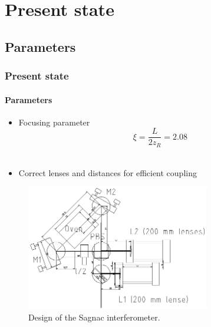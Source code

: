 \documentclass[serif,8pt]{beamer}
\begin{document}
\section{Present state}
\subsection{Parameters}
\begin{frame}[t]
	\frametitle{Present state}
	\framesubtitle{Parameters}
		\begin{itemize}
			\item Focusing parameter \cite{bennik}
					\begin{equation*}
							\xi = \frac{L}{2 z_R} = 2.08
						\label{eq:Focusing parameter}
					\end{equation*}\\
			\item Correct lenses and distances for efficient coupling
		\end{itemize}
	\begin{figure}[!ht]
	  \centering
	  \includegraphics[width=8cm]{SagnacDesign.png}
	  \caption{Design of the Sagnac interferometer.}
	\end{figure}
\end{frame}
\end{document}

